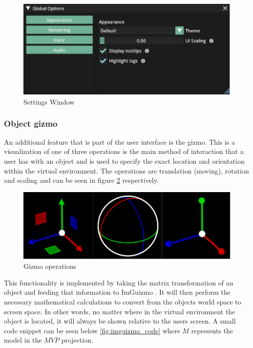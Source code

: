 \documentclass[11pt]{article}
\begin{document}
\begin{figure}[h!]
  \centering
  \includegraphics[width=\textwidth]{images/settings_window.png}
  \caption{Settings Window}
  \label{fig:settings_window}
\end{figure}

\subsubsection{Object gizmo}
An additional feature that is part of the user interface is the gizmo. This is a
visualization of one of three operations is the main method of interaction that
a user has with an object and is used to specify the exact location and
orientation within the virtual environment. The operations are translation
(moving), rotation and scaling and can be seen in figure \ref{fig:gizmo}
respectively.
\begin{figure}[h!]
  \centering
  \includegraphics[width=\textwidth]{images/gizmo.png}
  \caption{Gizmo operations}
  \label{fig:gizmo}
\end{figure}

This functionality is implemented by taking the matrix transformation of an
object and feeding that information to ImGuizmo \cite{imguizmo}. It will then
perform the necessary mathematical calculations to convert from the objects
world space to screen space. In other words, no matter where in the virtual
environment the object is located, it will always be shown relative to the users
screen. A small code snippet can be seen below \ref{fig:imguizmo_code} where
\(M\) represents the model in the \(MVP\) projection.
\end{document}
